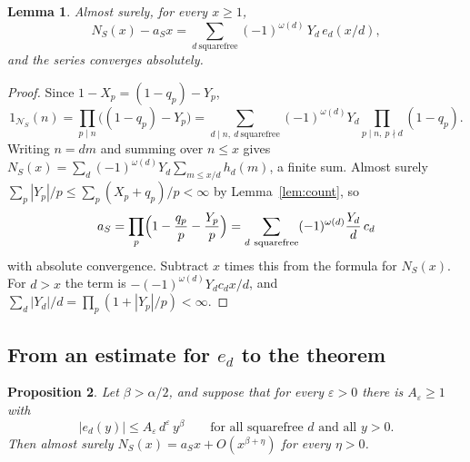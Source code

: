 \documentclass[11pt]{amsart}
\newtheorem{lemma}{Lemma}[section]
\newtheorem{proposition}[lemma]{Proposition}
\theoremstyle{remark}
\numberwithin{equation}{section}
\newcommand{\cN}{\mathcal{N}}
\newcommand{\eps}{\varepsilon}
\begin{document}
\begin{lemma}\label{lem:chaos}
Almost surely, for every $x\ge1$,
\[
N_S(x)-a_Sx=\sum_{d\ \mathrm{squarefree}}(-1)^{\omega(d)}\,Y_d\,e_d(x/d),
\]
and the series converges absolutely.
\end{lemma}

\begin{proof}
Since $1-X_p=(1-q_p)-Y_p$,
\[
1_{\cN_S}(n)=\prod_{p\mid n}\bigl((1-q_p)-Y_p\bigr)=\sum_{d\mid n,\ d\ \mathrm{squarefree}}(-1)^{\omega(d)}Y_d\prod_{p\mid n,\ p\nmid d}(1-q_p).
\]
Writing $n=dm$ and summing over $n\le x$ gives $N_S(x)=\sum_d(-1)^{\omega(d)}Y_d\sum_{m\le x/d}h_d(m)$, a finite sum. Almost surely $\sum_p|Y_p|/p\le\sum_p(X_p+q_p)/p<\infty$ by Lemma~\ref{lem:count}, so
\[
a_S=\prod_p\Bigl(1-\frac{q_p}{p}-\frac{Y_p}{p}\Bigr)=\sum_{d\ \mathrm{squarefree}}(-1)^{\omega(d)}\frac{Y_d}{d}\,c_d
\]
with absolute convergence. Subtract $x$ times this from the formula for $N_S(x)$. For $d>x$ the term is $-(-1)^{\omega(d)}Y_dc_dx/d$, and $\sum_d|Y_d|/d=\prod_p(1+|Y_p|/p)<\infty$.
\end{proof}

\subsection{From an estimate for $e_d$ to the theorem}

\begin{proposition}\label{prop:moment}
Let $\beta>\alpha/2$, and suppose that for every $\eps>0$ there is $A_\eps\ge1$ with
\begin{equation}\label{eq:star}
|e_d(y)|\le A_\eps\,d^{\eps}\,y^{\beta}\qquad\text{for all squarefree }d\text{ and all }y>0 .
\end{equation}
Then almost surely $N_S(x)=a_Sx+O(x^{\beta+\eta})$ for every $\eta>0$.
\end{proposition}
\end{document}
